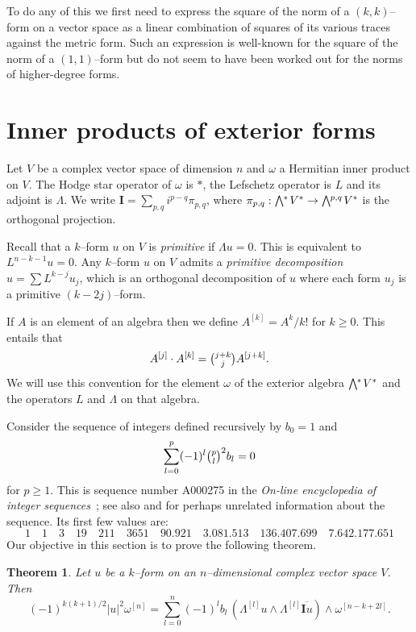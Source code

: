 \documentclass[11pt,a4paper]{amsart}
\def\^#1{^{[#1]}}
\def\bw#1{\bigwedge{}^{\mkern-5mu #1}\mkern2mu}
\def\I{\mathbf{I}}
\newtheorem{theo}{Theorem}[section]
\theoremstyle{definition}
\theoremstyle{remark}
\numberwithin{equation}{section}
\begin{document}
To do any of this we first need to express the square of the norm of a
$(k,k)$--form on a vector space as a linear combination of squares of its
various traces against the metric form. Such an expression is well-known
for the square of the norm of a $(1,1)$--form but do not seem to have been
worked out for the norms of higher-degree forms.




\section{Inner products of exterior forms}



Let $V$ be a complex vector space of dimension $n$ and $\omega$ a Hermitian
inner product on $V$. The Hodge star operator of $\omega$ is $*$,
the Lefschetz operator is $L$ and its adjoint is $\Lambda$. We write
$\I = \sum_{p,q} i^{p-q} \pi_{p,q}$, where $\pi_{p,q} : \bw{*} V^* \to
\bw{p,q} V^*$ is the orthogonal projection.

Recall that a $k$--form $u$ on $V$ is \emph{primitive} if $\Lambda u = 0$.
This is equivalent to $L^{n-k-1}u = 0$. Any $k$--form $u$ on $V$ admits a
\emph{primitive decomposition} $u = \sum L^{k-j} u_j$, which is an
orthogonal decomposition of $u$ where each form $u_j$ is a primitive
$(k-2j)$--form.

If $A$ is an element of an algebra then we define $A\^k = A^k / k!$ for $k
\geq 0$. This entails that
$$
A\^j \cdot A\^k = \tbinom{j+k}{j} A\^{j+k}.
$$
We will use this convention for the element $\omega$ of the exterior
algebra $\bw{*} V^*$ and the operators $L$ and $\Lambda$ on that
algebra.



Consider the sequence of integers defined recursively by $b_0 = 1$ and
\begin{equation}
\label{bezel}
\sum_{l=0}^{p} (-1)^{l} \tbinom{p}{l}^2 b_l = 0
\end{equation}
for $p \geq 1$. This is sequence number A000275 in the \textsl{On-line
encyclopedia of integer sequences}~\cite{OEIS}; see also \cite{Carlitz}
and \cite{Riordan} for perhaps unrelated information about the sequence.
Its first few values are: 
$$
1 \quad 1 \quad 3 \quad 19 \quad 211 \quad 3651 \quad
90.921 \quad 3.081.513 \quad 136.407.699 \quad 7.642.177.651
$$
Our objective in this section is to prove the following theorem.


\begin{theo}
    \label{thm:norm}
Let $u$ be a $k$--form on an $n$--dimensional complex vector
space $V$. Then
$$
    (-1)^{k(k+1)/2}
    \lvert u \rvert^2 \omega\^n
    = \sum_{l=0}^n (-1)^{l} b_l \, 
    (\Lambda\^l u \wedge \Lambda\^l \overline{\I u})
    \wedge \omega\^{n-k+2l}.
$$
\end{theo}
\end{document}
